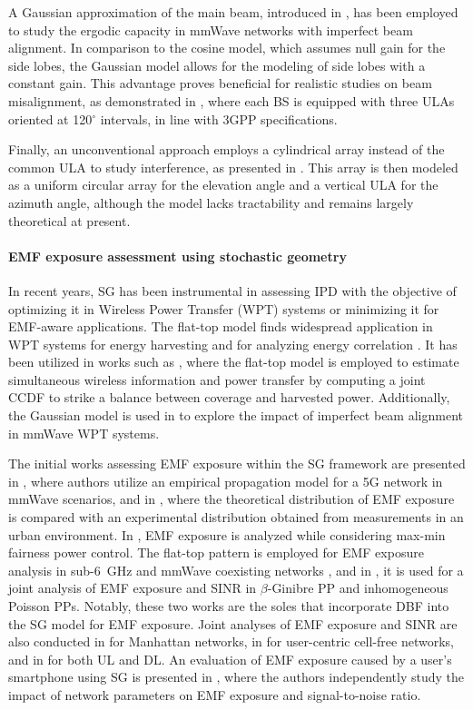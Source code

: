 A Gaussian approximation of the main beam, introduced in \cite{Thornburg15}, has been employed to study the ergodic capacity in mmWave networks with imperfect beam alignment. In comparison to the cosine model, which assumes null gain for the side lobes, the Gaussian model allows for the modeling of side lobes with a constant gain. This advantage proves beneficial for realistic studies on beam misalignment, as demonstrated in \cite{Rebato19}, where each BS is equipped with three ULAs oriented at 120$^\circ$ intervals, in line with 3GPP specifications.

Finally, an unconventional approach employs a cylindrical array instead of the common ULA to study interference, as presented in \cite{math10071156}. This array is then modeled as a uniform circular array for the elevation angle and a vertical ULA for the azimuth angle, although the model lacks tractability and remains largely theoretical at present.



\paragraph{EMF exposure assessment using stochastic geometry}
In recent years, SG has been instrumental in assessing IPD with the objective of optimizing it in Wireless Power Transfer (WPT) systems or minimizing it for EMF-aware applications. The flat-top model finds widespread application in WPT systems for energy harvesting \cite{Khan16, Guo19} and for analyzing energy correlation \cite{ECC}. It has been utilized in works such as \cite{TVC_SWIPT, SWIPT_MIMO}, where the flat-top model is employed to estimate simultaneous wireless information and power transfer by computing a joint CCDF to strike a balance between coverage and harvested power. Additionally, the Gaussian model is used in \cite{Wang21} to explore the impact of imperfect beam alignment in mmWave WPT systems.

The initial works assessing EMF exposure within the SG framework are presented in \cite{app10238753}, where authors utilize an empirical propagation model for a 5G network in mmWave scenarios, and in \cite{GontierAccess}, where the theoretical distribution of EMF exposure is compared with an experimental distribution obtained from measurements in an urban environment. In \cite{power_control}, EMF exposure is analyzed while considering max-min fairness power control. The flat-top pattern is employed for EMF exposure analysis in sub-6~GHz and mmWave coexisting networks \cite{9511258}, and in \cite{GontierTWC}, it is used for a joint analysis of EMF exposure and SINR in $\beta$-Ginibre PP and inhomogeneous Poisson PPs. Notably, these two works are the soles that incorporate DBF into the SG model for EMF exposure. Joint analyses of EMF exposure and SINR are also conducted in \cite{manhattan} for Manhattan networks, in \cite{cell-free} for user-centric cell-free networks, and in \cite{gontier2023uplink} for both UL and DL. An evaluation of EMF exposure caused by a user's smartphone using SG is presented in \cite{chen2023joint}, where the authors independently study the impact of network parameters on EMF exposure and signal-to-noise ratio.

